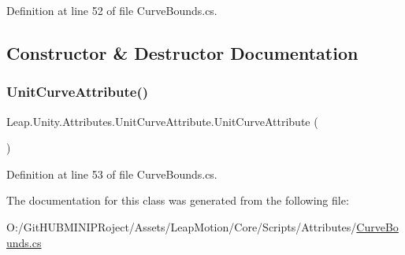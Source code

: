 Definition at line 52 of file Curve\+Bounds.\+cs.



\subsection{Constructor \& Destructor Documentation}
\mbox{\label{class_leap_1_1_unity_1_1_attributes_1_1_unit_curve_attribute_a09ca907549acb6c744691be347e1de18}} 
\subsubsection{\texorpdfstring{UnitCurveAttribute()}{UnitCurveAttribute()}}
{\footnotesize\ttfamily Leap.\+Unity.\+Attributes.\+Unit\+Curve\+Attribute.\+Unit\+Curve\+Attribute (\begin{DoxyParamCaption}{ }\end{DoxyParamCaption})}



Definition at line 53 of file Curve\+Bounds.\+cs.



The documentation for this class was generated from the following file\+:\begin{DoxyCompactItemize}
\item 
O\+:/\+Git\+H\+U\+B\+M\+I\+N\+I\+P\+Roject/\+Assets/\+Leap\+Motion/\+Core/\+Scripts/\+Attributes/\mbox{\hyperlink{_curve_bounds_8cs}{Curve\+Bounds.\+cs}}\end{DoxyCompactItemize}
